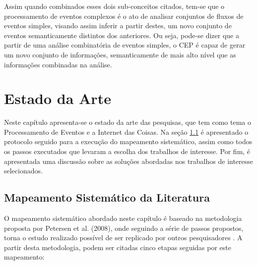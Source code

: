 \documentclass[ti,table]{texufpel} %
\begin{document}
  

Assim quando combinados esses dois sub-conceitos citados, tem-se que o processamento de eventos complexos é o ato de analisar conjuntos de fluxos de eventos simples, visando assim inferir a partir destes, um novo conjunto de eventos semanticamente distintos dos anteriores. Ou seja, pode-se dizer que a partir de uma análise combinatória de eventos simples, o CEP é capaz de gerar um novo conjunto de informações, semanticamente de mais alto nível que as informações combinadas na análise. 

  

  

  


  

\chapter{Estado da Arte}  

\label{cap:Estado_da_Arte} 

  

Neste capítulo apresenta-se o estado da arte das pesquisas, que tem como tema o Processamento de Eventos e a Internet das Coisas. Na seção \ref{sec:Mapeamento_Sistematico_da_Literatura} é apresentado o protocolo seguido para a execução do mapeamento sistemático, assim como todos os passos executados que levaram a escolha dos trabalhos de interesse. Por fim, é apresentada uma discussão sobre as soluções abordadas nos trabalhos de interesse selecionados.     

  

\section{Mapeamento Sistemático da Literatura} 
\label{sec:Mapeamento_Sistematico_da_Literatura} 

  

O mapeamento sistemático abordado neste capítulo é baseado na metodologia proposta por Petersen et al. (2008), onde seguindo a série de passos propostos, torna o estudo realizado possível de ser replicado por outros pesquisadores \cite{petersen08}. A partir desta metodologia, podem ser citadas cinco etapas seguidas por este mapeamento: 

  
\end{document}
